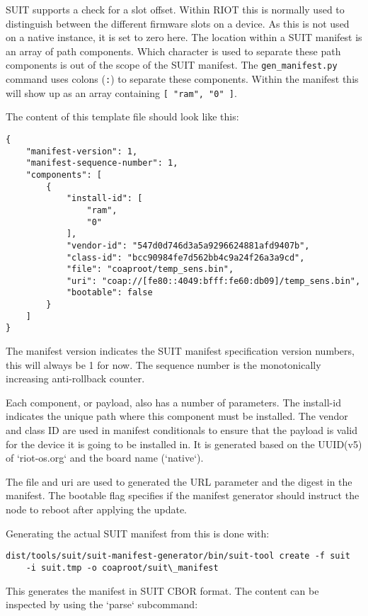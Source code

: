 \documentclass[../main.tex]{subfiles}
\begin{document}
SUIT supports a check for a slot offset. Within RIOT this is normally used to
distinguish between the different firmware slots on a device. As this is not
used on a native instance, it is set to zero here. The location within a SUIT
manifest is an array of path components. Which character is used to separate
these path components is out of the scope of the SUIT manifest. The
\texttt{gen\_manifest.py} command uses colons (\texttt{:}) to separate these components.
Within the manifest this will show up as an array containing \texttt{[ "ram", "0" ]}.

The content of this template file should look like this:

\begin{lstlisting}
{
    "manifest-version": 1,
    "manifest-sequence-number": 1,
    "components": [
        {
            "install-id": [
                "ram",
                "0"
            ],
            "vendor-id": "547d0d746d3a5a9296624881afd9407b",
            "class-id": "bcc90984fe7d562bb4c9a24f26a3a9cd",
            "file": "coaproot/temp_sens.bin",
            "uri": "coap://[fe80::4049:bfff:fe60:db09]/temp_sens.bin",
            "bootable": false
        }
    ]
}
\end{lstlisting}

The manifest version indicates the SUIT manifest specification version numbers,
this will always be 1 for now. The sequence number is the monotonically
increasing anti-rollback counter.

Each component, or payload, also has a number of parameters. The install-id
indicates the unique path where this component must be installed.
The vendor and class ID are used in manifest conditionals to ensure that the
payload is valid for the device it is going to be installed in. It is generated
based on the UUID(v5) of `riot-os.org` and the board name (`native`).

The file and uri are used to generated the URL parameter and the digest in the
manifest. The bootable flag specifies if the manifest generator should instruct
the node to reboot after applying the update.

Generating the actual SUIT manifest from this is done with:

\begin{lstlisting}
dist/tools/suit/suit-manifest-generator/bin/suit-tool create -f suit
	-i suit.tmp -o coaproot/suit\_manifest
\end{lstlisting}

This generates the manifest in SUIT CBOR format. The content can be inspected by
using the `parse` subcommand:
\end{document}

